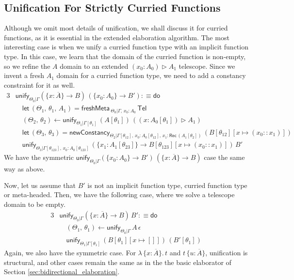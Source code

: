 \documentclass[acmsmall,review,anonymous,prologue,dvipsnames]{acmart}\settopmatter{printfolios=true,printccs=false,printacmref=false}
\newcommand{\slet}{\boldsymbol{\mathsf{let}}}
\newcommand{\freshMeta}[3]{\mathsf{freshMeta}\,_{#1|#2}\,#3}
\newcommand{\newConstancy}[5]{\mathsf{newConstancy}_{#1|#2,\,#3 : \Rec\,#4}\,#5}
\newcommand{\unify}{\mathsf{unify}}
\newcommand{\edo}{\boldsymbol{\mathsf{do}}}
\newcommand{\Tel}{\mathsf{Tel}}
\newcommand{\TCons}{\triangleright}
\newcommand{\Rec}{\mathsf{Rec}}
\newcommand{\ol}[1]{\overline{#1}}
\theoremstyle{remark}
\begin{document}
\subsection{Unification For Strictly Curried Functions}
Although we omit most details of unification, we shall discuss it for curried
functions, as it is essential in the extended elaboration algorithm.  The most
interesting case is when we unify a curried function type with an implicit
function type. In this case, we learn that the domain of the curried function is
non-empty, so we refine the $A$ domain to an extended $(x_0 : A_0) \TCons A_1$
telescope. Since we invent a fresh $A_1$ domain for a curried function type, we
need to add a constancy constraint for it as well.
\begin{alignat*}{3}
& \unify_{\Theta_0|\Gamma}(\{x : \ol{A}\}\to B)\,(\{x_0 : A_0\}\to B') :\equiv \edo\\
& \quad \slet\,(\Theta_1,\,\theta_1,\,A_1) = \freshMeta{\Theta_0}{\Gamma,\,x_0 : A_0}{\Tel}\\
& \quad (\Theta_2,\,\theta_2) \leftarrow
  \unify_{\Theta_1|\Gamma[\theta_1]}\,(A[\theta_1])\,((x : A_0[\theta_1])\TCons A_1)\\
& \quad \slet\,(\Theta_3,\,\theta_3) =
    \newConstancy{\Theta_2}{\Gamma[\theta_{12}],\,x_0 : A_0[\theta_{12}]}{x_1}{(A_1[\theta_2])}{(B[\theta_{12}][x\mapsto (x_0 :: x_1)])}\\
& \quad\unify_{\Theta_3|\Gamma[\theta_{123}],\,x_0 : A_0[\theta_{123}]}\,
         (\{x_1 : A_1[\theta_{23}]\}\to B[\theta_{123}][x\mapsto (x_0 :: x_1)])\,B'
\end{alignat*}
We have the symmetric $\unify_{\Theta_0|\Gamma}(\{x_0 : A_0\}\to B')\,(\{x :
\ol{A}\}\to B)$ case the same way as above.

Now, let us assume that $B'$ is not an implicit function type, curried function
type or meta-headed. Then, we have the following case, where we solve a
telescope domain to be empty.
\begin{alignat*}{3}
& \unify_{\Theta_0|\Gamma}(\{x : \ol{A}\}\to B)\,B' :\equiv \edo\\
& \quad (\Theta_1,\,\theta_1) \leftarrow \unify_{\Theta_0|\Gamma}\,A\,\epsilon\\
& \quad \unify_{\Theta_1|\Gamma[\theta_1]}\,(B[\theta_1][x\mapsto[]])\,(B'[\theta_1])
\end{alignat*}
Again, we also have the symmetric case. For $\lambda\,\{x : \ol{A}\}.\,t$ and
$t\,\{u : \ol{A}\}$, unification is structural, and other cases remain the same
as in the the basic elaborator of Section \ref{sec:bidirectional_elaboration}.
\end{document}
